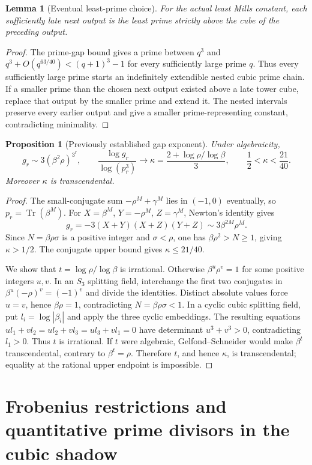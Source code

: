 \documentclass[11pt,a4paper]{article}
\newtheorem{lemma}[theorem]{Lemma}
\newtheorem{proposition}[theorem]{Proposition}
\theoremstyle{definition}
\theoremstyle{remark}
\numberwithin{equation}{section}
\DeclareMathOperator{\Tr}{Tr}\DeclareMathOperator{\Norm}{N}
\begin{document}
\begin{lemma}[Eventual least-prime choice]
For the actual least Mills constant, each sufficiently late next output is the least prime strictly above the cube of the preceding output.
\end{lemma}
\begin{proof}
The prime-gap bound gives a prime between $q^3$ and $q^3+O(q^{63/40})<(q+1)^3-1$ for every sufficiently large prime $q$. Thus every sufficiently large prime starts an indefinitely extendible nested cubic prime chain. If a smaller prime than the chosen next output existed above a late tower cube, replace that output by the smaller prime and extend it. The nested intervals preserve every earlier output and give a smaller prime-representing constant, contradicting minimality.
\end{proof}

\begin{proposition}[Previously established gap exponent]
Under algebraicity,
\[
 g_r\sim3(\beta^2\rho)^{3^r},\qquad
 \frac{\log g_r}{\log(p_r^3)}\longrightarrow
 \kappa=\frac{2+\log\rho/\log\beta}{3},
 \qquad \frac12<\kappa<\frac{21}{40}.
\]
Moreover $\kappa$ is transcendental.
\end{proposition}
\begin{proof}
The small-conjugate sum $-\rho^M+\gamma^M$ lies in $(-1,0)$ eventually, so $p_r=\Tr(\beta^M)$. For $X=\beta^M$, $Y=-\rho^M$, $Z=\gamma^M$, Newton's identity gives
\[
 g_r=-3(X+Y)(X+Z)(Y+Z)\sim3\beta^{2M}\rho^M.
\]
Since $N=\beta\rho\sigma$ is a positive integer and $\sigma<\rho$, one has $\beta\rho^2>N\ge1$, giving $\kappa>1/2$. The conjugate upper bound gives $\kappa\le21/40$.

We show that $t=\log\rho/\log\beta$ is irrational. Otherwise $\beta^u\rho^v=1$ for some positive integers $u,v$. In an $S_3$ splitting field, interchange the first two conjugates in $\beta^u(-\rho)^v=(-1)^v$ and divide the identities. Distinct absolute values force $u=v$, hence $\beta\rho=1$, contradicting $N=\beta\rho\sigma<1$. In a cyclic cubic splitting field, put $l_i=\log|\beta_i|$ and apply the three cyclic embeddings. The resulting equations $ul_1+vl_2=ul_2+vl_3=ul_3+vl_1=0$ have determinant $u^3+v^3>0$, contradicting $l_1>0$. Thus $t$ is irrational. If $t$ were algebraic, Gelfond--Schneider would make $\beta^t$ transcendental, contrary to $\beta^t=\rho$. Therefore $t$, and hence $\kappa$, is transcendental; equality at the rational upper endpoint is impossible.
\end{proof}
\section{Frobenius restrictions and quantitative prime divisors in the cubic shadow}
\end{document}
